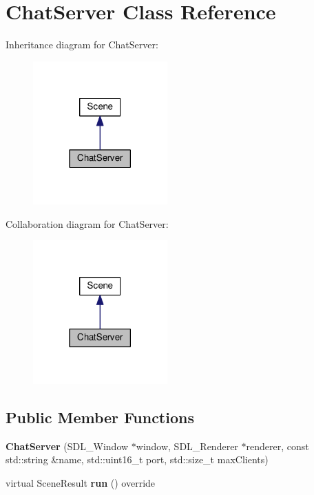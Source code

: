 \hypertarget{classChatServer}{}\section{Chat\+Server Class Reference}
\label{classChatServer}


Inheritance diagram for Chat\+Server\+:\nopagebreak
\begin{figure}[H]
\begin{center}
\leavevmode
\includegraphics[width=146pt]{classChatServer__inherit__graph}
\end{center}
\end{figure}


Collaboration diagram for Chat\+Server\+:\nopagebreak
\begin{figure}[H]
\begin{center}
\leavevmode
\includegraphics[width=146pt]{classChatServer__coll__graph}
\end{center}
\end{figure}
\subsection*{Public Member Functions}
\begin{DoxyCompactItemize}
\item 
{\bfseries Chat\+Server} (S\+D\+L\+\_\+\+Window $\ast$window, S\+D\+L\+\_\+\+Renderer $\ast$renderer, const std\+::string \&name, std\+::uint16\+\_\+t port, std\+::size\+\_\+t max\+Clients)\hypertarget{classChatServer_a8db1cc9defb74c00f91e68a728ac69e0}{}\label{classChatServer_a8db1cc9defb74c00f91e68a728ac69e0}

\item 
virtual Scene\+Result {\bfseries run} () override\hypertarget{classChatServer_a5da89ab8a56264553c21a4de2124d50a}{}\label{classChatServer_a5da89ab8a56264553c21a4de2124d50a}

\end{DoxyCompactItemize}
